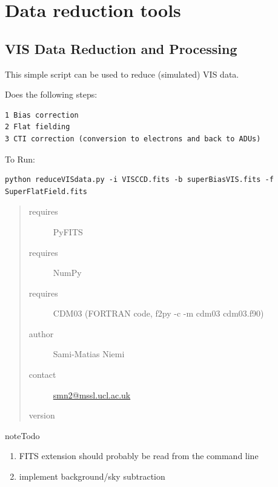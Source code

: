 \documentclass[a4paper,12pt,english]{sphinxmanual}
\begin{document}
\section{Data reduction tools}
\label{reduction:module-reduction.reduceVISdata}\label{reduction::doc}\label{reduction:data-reduction-tools}

\subsection{VIS Data Reduction and Processing}
\label{reduction:vis-data-reduction-and-processing}
This simple script can be used to reduce (simulated) VIS data.

Does the following steps:

\begin{Verbatim}[commandchars=\\\{\}]
1 Bias correction
2 Flat fielding
3 CTI correction (conversion to electrons and back to ADUs)
\end{Verbatim}

To Run:

\begin{Verbatim}[commandchars=\\\{\}]
python reduceVISdata.py -i VISCCD.fits -b superBiasVIS.fits -f SuperFlatField.fits
\end{Verbatim}
\begin{quote}\begin{description}
\item[{requires}] \leavevmode
PyFITS

\item[{requires}] \leavevmode
NumPy

\item[{requires}] \leavevmode
CDM03 (FORTRAN code, f2py -c -m cdm03 cdm03.f90)

\item[{author}] \leavevmode
Sami-Matias Niemi

\item[{contact}] \leavevmode
\href{mailto:smn2@mssl.ucl.ac.uk}{smn2@mssl.ucl.ac.uk}

\item[{version}] 

\end{description}\end{quote}

\begin{notice}{note}{Todo}
\begin{enumerate}
\item {} 
FITS extension should probably be read from the command line

\item {} 
implement background/sky subtraction

\end{enumerate}
\end{notice}
\end{document}
